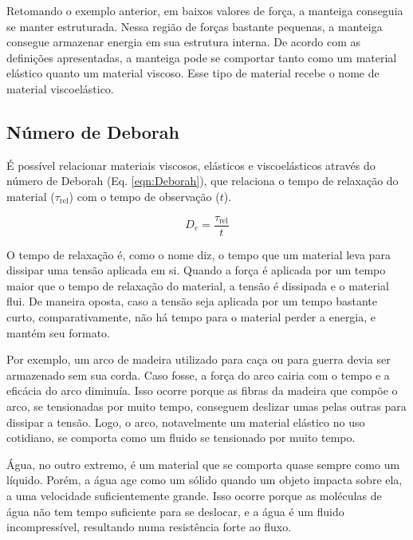 		Retomando o exemplo anterior, em baixos valores de força, a manteiga conseguia se manter estruturada. Nessa região de forças bastante pequenas, a manteiga consegue armazenar energia em sua estrutura interna. De acordo com as definições apresentadas, a manteiga pode se comportar tanto como um material elástico quanto um material viscoso. Esse tipo de material recebe o nome de material viscoelástico.
		
		\subsection{Número de Deborah} 
		
		É possível relacionar materiais viscosos, elásticos e viscoelásticos através do número de Deborah (Eq. \ref{eqn:Deborah}), que relaciona o tempo de relaxação do material (\(\tau_{\mathrm{rel}}\)) com o tempo de observação (\(t\)). 
		
		\begin{equation}
			D_e = \dfrac{\tau_{\text{rel}}}{t}
			\label{eqn:Deborah}
		\end{equation}
		
		O tempo de relaxação é, como o nome diz, o tempo que um material leva para dissipar uma tensão aplicada em si. Quando a força é aplicada por um tempo maior que o tempo de relaxação do material, a tensão é dissipada e o material flui. De maneira oposta, caso a tensão seja aplicada por um tempo bastante curto, comparativamente, não há tempo para o material perder a energia, e mantém seu formato.
		
		Por exemplo, um arco de madeira utilizado para caça ou para guerra devia ser armazenado sem sua corda. Caso fosse, a força do arco cairia com o tempo e a eficácia do arco diminuía. Isso ocorre porque as fibras da madeira que compõe o arco, se tensionadas por muito tempo, conseguem deslizar umas pelas outras para dissipar a tensão. Logo, o arco, notavelmente um material elástico no uso cotidiano, se comporta como um fluido se tensionado por muito tempo.
		
		Água, no outro extremo, é um material que se comporta quase sempre como um líquido. Porém, a água age como um sólido quando um objeto impacta sobre ela, a uma velocidade suficientemente grande. Isso ocorre porque as moléculas de água não tem tempo suficiente para se deslocar, e a água é um fluido incompressível, resultando numa resistência forte ao fluxo.
		
